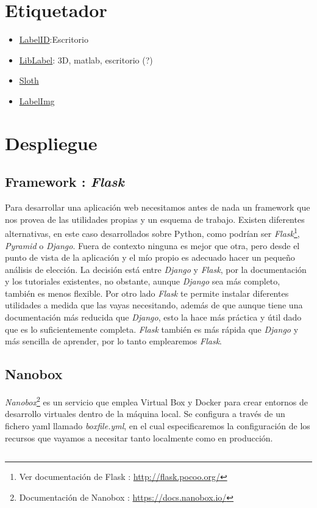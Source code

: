 
\section{Etiquetador}


\begin{itemize}
	\item \href{https://sweppner.github.io/labeld/}{LabelID}:Escritorio
	\item \href{http://www.cvlibs.net/software/liblabel/}{LibLabel}: 3D, matlab, escritorio (?)
	\item \href{https://cvhci.anthropomatik.kit.edu/~baeuml/projects/a-universal-labeling-tool-for-computer-vision-sloth/}{Sloth}
	\item \href{https://github.com/tzutalin/labelImg}{LabelImg}
\end{itemize}

\section{Despliegue}
\subsection{Framework : \textit{Flask}}
Para desarrollar una aplicación web necesitamos antes de nada un framework que nos provea de las utilidades propias y un esquema de trabajo. Existen diferentes alternativas, en este caso desarrollados sobre Python, como podrían ser \textit{Flask}\footnote{Ver documentación de Flask : \url{http://flask.pocoo.org/}}, \textit{Pyramid} o \textit{Django}. Fuera de contexto ninguna es mejor que otra, pero desde el punto de vista de la aplicación y el mío propio es adecuado hacer un pequeño análisis de elección.
La decisión está entre\textit{ Django} y \textit{Flask}, por la documentación y los tutoriales existentes, no obstante, aunque \textit{Django} sea más completo, también es menos flexible. Por otro lado \textit{Flask} te permite instalar diferentes utilidades a medida que las vayas necesitando, además de que aunque tiene una documentación más reducida que \textit{Django}, esto la hace más práctica y útil dado que es lo suficientemente completa. \textit{Flask} también es más rápida que \textit{Django} y más sencilla de aprender, por lo tanto emplearemos \textit{Flask}.
\subsection{Nanobox}
\textit{Nanobox}\footnote{Documentación de Nanobox : \url{https://docs.nanobox.io/}} es un servicio que emplea Virtual Box y Docker para crear entornos de desarrollo virtuales dentro de la máquina local. Se configura a través de un fichero yaml llamado \textit{boxfile.yml}, en el cual especificaremos la configuración de los recursos que vayamos a necesitar tanto localmente como en producción. 

\subsection{}